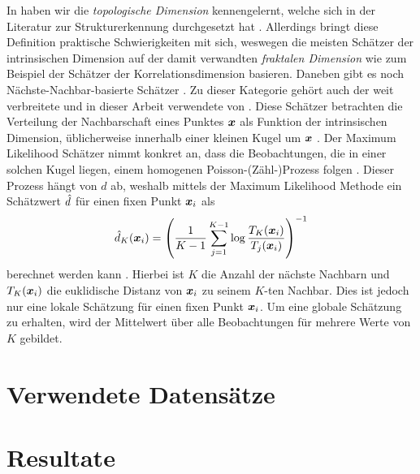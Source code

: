 In  haben wir die \textit{topologische
	Dimension} kennengelernt, welche sich in der Literatur zur Strukturerkennung durchgesetzt hat \parencite[1]{Campadelli.2015}. Allerdings bringt diese Definition praktische Schwierigkeiten mit sich,
weswegen die meisten Schätzer der intrinsischen Dimension auf der damit verwandten
\textit{fraktalen Dimension} wie zum Beispiel der Schätzer der Korrelationsdimension \parencite{Camastra.2002} basieren. Daneben gibt es noch Nächste-Nachbar-basierte Schätzer \parencite[1]{Campadelli.2015}. Zu dieser Kategorie gehört auch der weit verbreitete und in dieser
Arbeit verwendete  von \textcite{Levina.2004}. Diese Schätzer
betrachten die Verteilung der Nachbarschaft eines Punktes $\bm{x}$ als Funktion der
intrinsischen Dimension, üblicherweise innerhalb einer kleinen Kugel um $\bm{x}$
\Parencite[8]{Campadelli.2015}. Der Maximum Likelihood Schätzer nimmt konkret an, dass die
Beobachtungen, die in einer solchen Kugel liegen, einem homogenen Poisson-(Zähl-)Prozess folgen
\Parencite[2]{Levina.2004}. Dieser Prozess hängt von $d$ ab, weshalb mittels der Maximum Likelihood
Methode ein Schätzwert $\hat{d}$ für einen fixen Punkt $\bm{x}_i$ als
\begin{equation}
	\hat{d}_K(\bm{x}_i) = \left( \frac{1}{K - 1} \sum_{j=1}^{K - 1} \log \frac{T_K(\bm{x}_i)}{T_j(\bm{x}_i)} \right)^{-1}
\end{equation}
berechnet werden kann \Parencite[4]{Levina.2004}. Hierbei ist $K$ die Anzahl der nächste Nachbarn und $T_{K}(\bm{x}_i)$ die euklidische Distanz von $\bm{x}_i$ zu seinem $K$-ten Nachbar. Dies ist jedoch nur eine lokale Schätzung für einen fixen Punkt $\bm{x}_i$. Um eine globale Schätzung zu erhalten, wird der Mittelwert über alle Beobachtungen für mehrere Werte von $K$ gebildet.
\section{Verwendete Datensätze}
\label{ch:Vergleich:sec:VerwendeteDatensaetze}
\section{Resultate}
\label{ch:Vergleich:sec:Resultate}
